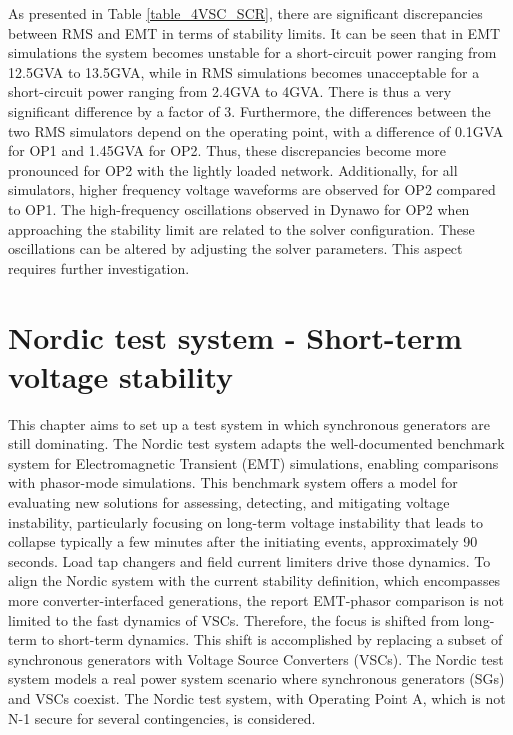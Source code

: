 \documentclass{report}
\begin{document}
As presented in Table \ref{table_4VSC_SCR}, there are significant discrepancies between RMS and EMT in terms of stability limits. It can be seen that in EMT simulations the system becomes unstable for a short-circuit power ranging from 12.5GVA to 13.5GVA, while in RMS simulations becomes unacceptable for a short-circuit power ranging from 2.4GVA to 4GVA. There is thus a very significant difference by a factor of 3. Furthermore, the differences between the two RMS simulators depend on the operating point, with a difference of 0.1GVA for OP1 and 1.45GVA for OP2. Thus, these discrepancies become more pronounced for OP2 with the lightly loaded network. Additionally, for all simulators, higher frequency voltage waveforms are observed for OP2 compared to OP1. The high-frequency oscillations observed in Dynawo for OP2 when approaching the stability limit are related to the solver configuration. These oscillations can be altered by adjusting the solver parameters. This aspect requires further investigation.

\chapter{Nordic test system - Short-term voltage
stability}
This chapter aims to set up a test system in which synchronous generators are still dominating. The Nordic test system adapts the well-documented benchmark system \cite{van2015test} for Electromagnetic Transient (EMT) simulations, enabling comparisons with phasor-mode simulations. This benchmark system offers a model for evaluating new solutions for assessing, detecting, and mitigating voltage instability, particularly focusing on long-term voltage instability that leads to collapse typically a few minutes after the initiating events, approximately 90 seconds. Load tap changers and field current limiters drive those dynamics. To align the Nordic system with the current stability definition, which encompasses more converter-interfaced generations, the report EMT-phasor comparison is not limited to the fast dynamics of VSCs. Therefore, the focus is shifted from long-term to short-term dynamics\cite{hatziargyriou2020definition}. This shift is accomplished by replacing a subset of synchronous generators with Voltage Source Converters (VSCs). The Nordic test system models a real power system scenario where synchronous generators (SGs) and VSCs coexist. The Nordic test system, with Operating Point A, which is not N-1 secure for several contingencies, is considered.
\end{document}
